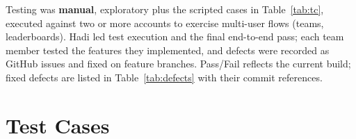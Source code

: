 \documentclass[11pt]{article}
\begin{document}
Testing was \textbf{manual}, exploratory plus the scripted cases in
Table~\ref{tab:tc}, executed against two or more accounts to exercise
multi-user flows (teams, leaderboards). Hadi led test execution and the final
end-to-end pass; each team member tested the features they implemented, and
defects were recorded as GitHub issues and fixed on feature branches. Pass/Fail
reflects the current build; fixed defects are listed in
Table~\ref{tab:defects} with their commit references.

\section{Test Cases}
\end{document}
